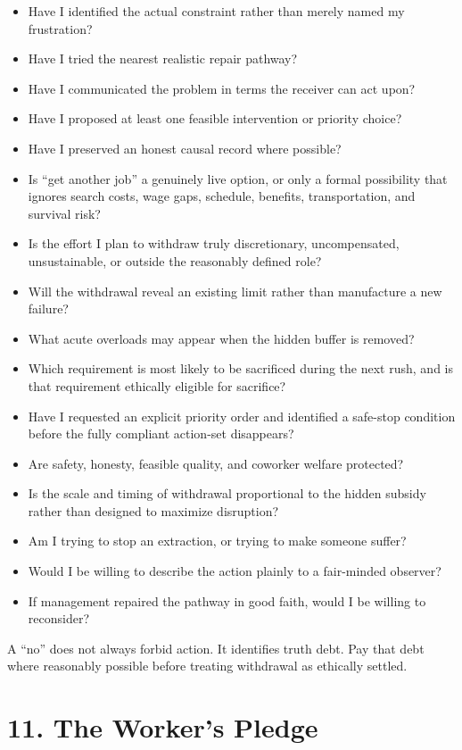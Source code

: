 \documentclass[11pt,oneside]{article}
\providecommand{\tightlist}{%
  \setlength{\itemsep}{0.22em}\setlength{\parskip}{0pt}}
\begin{document}
\begin{itemize}
\tightlist
\item
  Have I identified the actual constraint rather than merely named my
  frustration?
\item
  Have I tried the nearest realistic repair pathway?
\item
  Have I communicated the problem in terms the receiver can act upon?
\item
  Have I proposed at least one feasible intervention or priority choice?
\item
  Have I preserved an honest causal record where possible?
\item
  Is ``get another job'' a genuinely live option, or only a formal
  possibility that ignores search costs, wage gaps, schedule, benefits,
  transportation, and survival risk?
\item
  Is the effort I plan to withdraw truly discretionary, uncompensated,
  unsustainable, or outside the reasonably defined role?
\item
  Will the withdrawal reveal an existing limit rather than manufacture a
  new failure?
\item
  What acute overloads may appear when the hidden buffer is removed?
\item
  Which requirement is most likely to be sacrificed during the next
  rush, and is that requirement ethically eligible for sacrifice?
\item
  Have I requested an explicit priority order and identified a safe-stop
  condition before the fully compliant action-set disappears?
\item
  Are safety, honesty, feasible quality, and coworker welfare protected?
\item
  Is the scale and timing of withdrawal proportional to the hidden
  subsidy rather than designed to maximize disruption?
\item
  Am I trying to stop an extraction, or trying to make someone suffer?
\item
  Would I be willing to describe the action plainly to a fair-minded
  observer?
\item
  If management repaired the pathway in good faith, would I be willing
  to reconsider?
\end{itemize}

A ``no'' does not always forbid action. It identifies truth debt. Pay
that debt where reasonably possible before treating withdrawal as
ethically settled.

\section{11. The Worker's Pledge}\label{the-workers-pledge}
\end{document}
